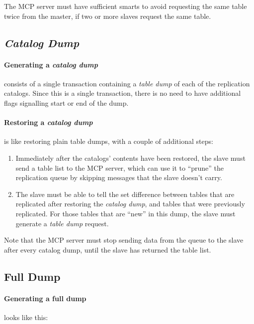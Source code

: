 \documentclass{article}
\newcommand{\catdump}{\emph{catalog dump}}
\newcommand{\Catdump}{\emph{Catalog Dump}}
\newcommand{\tabdump}{\emph{table dump}}
\begin{document}
The MCP server must have sufficient smarts
to avoid requesting the same table twice from the master,
if two or more slaves request the same table.

\subsection{\Catdump}

\paragraph{Generating a \catdump}
consists of a single transaction containing
a \tabdump{} of each of the replication catalogs.
Since this is a single transaction,
there is no need to have additional flags signalling
start or end of the dump.

\paragraph{Restoring a \catdump}
is like restoring plain table dumps,
with a couple of additional steps:

\begin{enumerate}
\item Immediately after the catalogs' contents have been restored,
the slave must send a table list to the MCP server,
which can use it to ``prune'' the replication queue
by skipping messages that the slave doesn't carry.

\item
The slave must be able to tell the set difference
between tables that are replicated after restoring the \catdump,
and tables that were previously replicated.
For those tables that are ``new'' in this dump,
the slave must generate a \tabdump{} request.
\end{enumerate}

Note that the MCP server must stop sending data from the queue
to the slave after every catalog dump,
until the slave has returned the table list.

\subsection{Full Dump}

\paragraph{Generating a full dump} looks like this:
\end{document}
